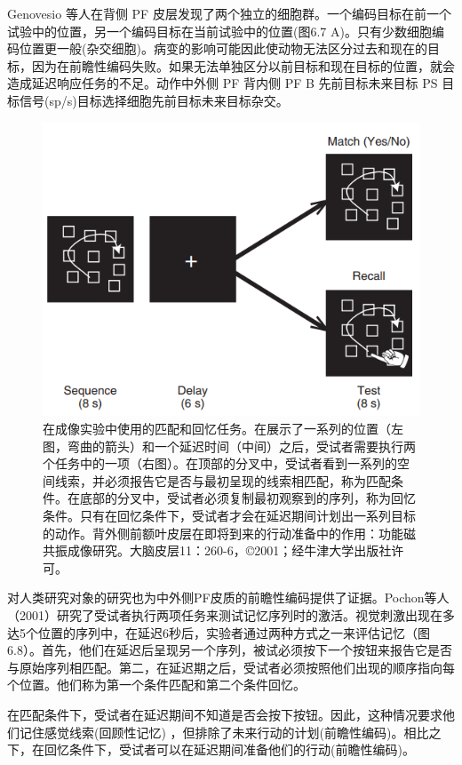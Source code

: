 Genovesio 等人在背侧 PF 皮层发现了两个独立的细胞群。一个编码目标在前一个试验中的位置，另一个编码目标在当前试验中的位置(图6.7 A)。只有少数细胞编码位置更一般(杂交细胞)。病变的影响可能因此使动物无法区分过去和现在的目标，因为在前瞻性编码失败。如果无法单独区分以前目标和现在目标的位置，就会造成延迟响应任务的不足。动作中外侧 PF 背内侧 PF B 先前目标未来目标 PS 目标信号(sp/s)目标选择细胞先前目标未来目标杂交。
\begin{figure}
	\centering
	\includegraphics[width=0.5\linewidth]{image_pfc/Fig_6_8}
	\caption{在成像实验中使用的匹配和回忆任务。在展示了一系列的位置（左图，弯曲的箭头）和一个延迟时间（中间）之后，受试者需要执行两个任务中的一项（右图）。在顶部的分叉中，受试者看到一系列的空间线索，并必须报告它是否与最初呈现的线索相匹配，称为匹配条件。在底部的分叉中，受试者必须复制最初观察到的序列，称为回忆条件。只有在回忆条件下，受试者才会在延迟期间计划出一系列目标的动作。背外侧前额叶皮层在即将到来的行动准备中的作用：功能磁共振成像研究。大脑皮层11：260-6，©2001；经牛津大学出版社许可。}
	\label{fig:fig}
\end{figure}
对人类研究对象的研究也为中外侧PF皮质的前瞻性编码提供了证据。Pochon等人（2001）研究了受试者执行两项任务来测试记忆序列时的激活。视觉刺激出现在多达5个位置的序列中，在延迟6秒后，实验者通过两种方式之一来评估记忆（图6.8）。首先，他们在延迟后呈现另一个序列，被试必须按下一个按钮来报告它是否与原始序列相匹配。第二，在延迟期之后，受试者必须按照他们出现的顺序指向每个位置。他们称为第一个条件匹配和第二个条件回忆。

在匹配条件下，受试者在延迟期间不知道是否会按下按钮。因此，这种情况要求他们记住感觉线索(回顾性记忆) ，但排除了未来行动的计划(前瞻性编码)。相比之下，在回忆条件下，受试者可以在延迟期间准备他们的行动(前瞻性编码)。

